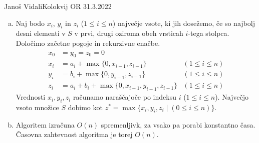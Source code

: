 \begin{naloga}{Janoš Vidali}{Kolokvij OR 31.3.2022}
\begin{odgovor}
\begin{enumerate}[(a)]
\item Naj bodo $x_i$, $y_i$ in $z_i$ ($1 \le i \le n$)
največje vsote, ki jih dosežemo,
če so najbolj desni elementi v $S$
v prvi, drugi oziroma obeh vrsticah $i$-tega stolpca.
Določimo začetne pogoje in rekurzivne enačbe.
\begin{align*}
x_0 &= y_0 = z_0 = 0 \\
x_i &= a_i + \max\{0, x_{i-1}, z_{i-1}\} & (1 \le i \le n) \\
y_i &= b_i + \max\{0, y_{i-1}, z_{i-1}\} & (1 \le i \le n) \\
z_i &= a_i + b_i + \max\{0, x_{i-1}, y_{i-1}, z_{i-1}\} & (1 \le i \le n)
\end{align*}
Vrednosti $x_i, y_i, z_i$ računamo naraščajoče po indeksu $i$ ($1 \le i \le n$).
Največjo vsoto množice $S$ dobimo kot
$z^* = \max\{x_i, y_i, z_i \mid (0 \le i \le n)\}$.

\item Algoritem izračuna $O(n)$ spremenljivk,
za vsako pa porabi konstantno časa.
Časovna zahtevnost algoritma je torej $O(n)$.


\end{enumerate}
\end{odgovor}
\end{naloga}
